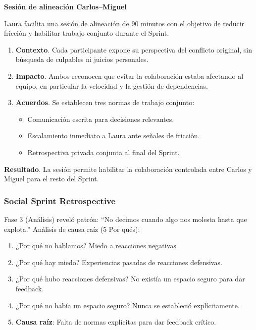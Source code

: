 \begin{escenario}

    \textbf{Sesión de alineación Carlos–Miguel}

    Laura facilita una sesión de alineación de 90 minutos con el objetivo
    de reducir fricción y habilitar trabajo conjunto durante el Sprint.

    \begin{enumerate}
        \item \textbf{Contexto}. Cada participante expone su perspectiva del conflicto original,
              sin búsqueda de culpables ni juicios personales.

        \item \textbf{Impacto}. Ambos reconocen que evitar la colaboración estaba afectando
              al equipo, en particular la velocidad y la gestión de dependencias.

        \item \textbf{Acuerdos}. Se establecen tres normas de trabajo conjunto:
              \begin{itemize}
                  \item Comunicación escrita para decisiones relevantes.
                  \item Escalamiento inmediato a Laura ante señales de fricción.
                  \item Retrospectiva privada conjunta al final del Sprint.
              \end{itemize}
    \end{enumerate}

    \textbf{Resultado}. La sesión permite habilitar la colaboración controlada
    entre Carlos y Miguel para el resto del Sprint.

\end{escenario}

\subsubsection{Social Sprint Retrospective}

Fase 3 (Análisis) reveló patrón: ``No decimos cuando algo nos molesta hasta que explota.''
Análisis de causa raíz (5 Por qués):
\begin{enumerate}
    \item ¿Por qué no hablamos?
          Miedo a reacciones negativas.

    \item ¿Por qué hay miedo?
          Experiencias pasadas de reacciones defensivas.

    \item ¿Por qué hubo reacciones defensivas?
          No existía un espacio seguro para dar feedback.

    \item ¿Por qué no había un espacio seguro?
          Nunca se estableció explícitamente.

    \item \textbf{Causa raíz}: Falta de normas explícitas para dar feedback crítico.
\end{enumerate}

